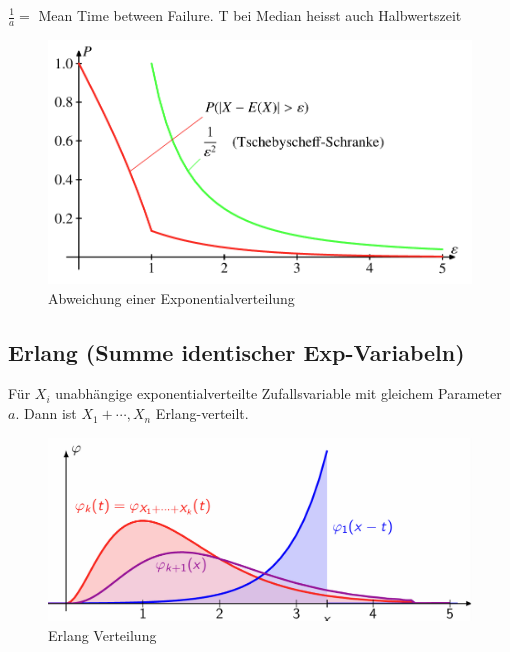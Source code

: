 \documentclass[../Main.tex]{subfiles}
\begin{document}
\(\frac{1}{a} = \) Mean Time between Failure.
T bei Median heisst auch Halbwertszeit

\begin{figure}[H]
    \centering
    \includegraphics[width=0.75\linewidth]{Images/exp-abweichung.png}
    \caption{Abweichung einer Exponentialverteilung}
\end{figure}


\subsection{Erlang (Summe identischer Exp-Variabeln)}
Für \(X_i\) unabhängige exponentialverteilte
Zufallsvariable mit gleichem Parameter \(a\).
Dann ist \(X_1+\cdots,X_n\) Erlang-verteilt.


\begin{figure}[H]
    \centering
    \includegraphics[width=0.75\linewidth]{Images/erlang.png}
    \caption{Erlang Verteilung}
\end{figure}
\end{document}
